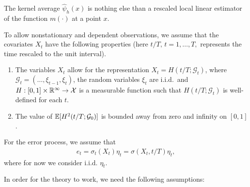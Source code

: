 \documentclass[a4paper,12pt]{article}
\begin{document}
The kernel average $\widehat{\psi}_{h}(x)$ is nothing else than a rescaled local linear estimator of the function $m(\cdot)$ at a point $x$.

To allow nonstationary and dependent observations, we assume that the covariates $X_t$ have the following properties (here $t/T,\, t = 1,\ldots, T,$ represents the time rescaled to the unit interval).
\begin{enumerate}[label=(C\arabic*),leftmargin=1.05cm]
\item \label{C-reg1} The variables $X_{t}$ allow for the representation $X_{t} = H(t/T; \mathcal{G}_{t})$, where $\mathcal{G}_{t} = (\ldots, \xi_{t-1}, \xi_{t})$, the random variables $\xi_{t}$ are i.i.d.\ and $H: [0, 1] \times \mathbb{R}^\infty \rightarrow \mathcal{X}$ is a measurable function such that $H(t/T; \mathcal{G}_{t})$ is well-defined for each $t$.%
\item \label{C-reg2} The value of $\mathbb{E}[H^2 (t/T; \mathcal{G}_{0})]$ is bounded away from zero and infinity on $[0, 1]$.
\end{enumerate}




For the error process, we assume that
\begin{align*}
e_t = \sigma_t(X_t)\eta_t = \sigma(X_t, t/T) \eta_t,
\end{align*}
where for now we consider i.i.d. $\eta_t$.


In order for the theory to work, we need the following assumptions:
\end{document}
